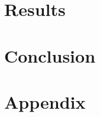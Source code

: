 \documentclass[10pt]{article} %
\begin{document}
\section{Results}


\vspace{-0.3cm}
\section{Conclusion}
\vspace{-0.2cm}



\nocite{*}




\section{Appendix}

\end{document}
